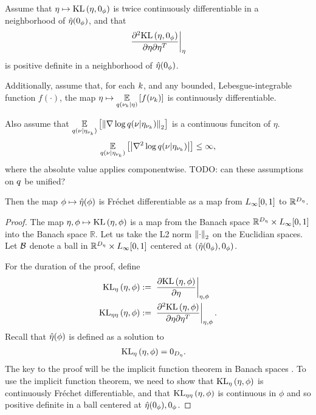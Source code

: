 \begin{thm}
%
Assume that $\eta \mapsto \mathrm{KL}\left(\eta, 0_\phi\right)$ is twice continuously
differentiable in a neighborhood of $\hat\eta(0_\phi)$, and that
%
\begin{align*}
%
\fracat{\partial^2 \KL{\eta, \phiz}}
                {\partial \eta \partial \eta^T}
                {\eta}%
\end{align*}
%
is positive definite in a neighborhood of $\hat\eta(0_\phi)$.

Additionally, assume that, for each $k$, and any bounded, Lebesgue-integrable
function $f(\cdot)$, the map $\eta \mapsto \underset{q(\nu_{k} \vert \eta)}{\mathbb{E}}\left[f(\nu_{k})\right]$
is continuously differentiable.

Also assume that $\underset{q(\nu \vert \eta_{\nu_{k}})}{\mathbb{E}}\left[\left\Vert\nabla \log q(\nu \vert \eta_{\nu_{k}})\right\Vert_2\right]$
is a continuous funciton of $\eta$.
%
\begin{align*}
%
\expect{\q(\nu \vert \etanuk)}{\abs{\nabla^2 \log \q(\nu \vert \etanuk)}} \le{} \infty,
%
\end{align*}
%
where the absolute value applies componentwise.  TODO: can these assumptions
on $q$ be unified?

Then the map $\phi \mapsto \hat\eta(\phi)$ is Fr{\'e}chet differentiable
as a map from ${L_{\infty}[0,1]}$ to $\mathbb{R}^{D_{\eta}}$.
%
\begin{proof}
%
The map $\eta, \phi \mapsto \mathrm{KL}\left(\eta, \phi\right)$ is a map from the Banach space
$\mathbb{R}^{D_{\eta}} \times {L_{\infty}[0,1]}$ into the Banach space $\mathbb{R}$. Let us
take the L2 norm $\left\Vert\cdot\right\Vert_2$ on the Euclidian spaces.  Let $\mathcal{B}$ denote a
ball in $\mathbb{R}^{D_{\eta}} \times {L_{\infty}[0,1]}$ centered at $(\hat\eta(0_\phi), 0_\phi)$.

For the duration of the proof, define
%
\begin{align*}
%
\KLgrad{\eta, \phi} :={}&
    \fracat{\partial \KL{\eta, \phi}}{\partial \eta}{\eta, \phi}\\
\KLhess{\eta, \phi} :={}&
    \fracat{\partial^2 \KL{\eta, \phi}}
           {\partial \eta \partial \eta^T}{\eta, \phi}.
%
\end{align*}
%
Recall that $\hat\eta(\phi)$ is defined as a solution to
%
\begin{align*}
%
\KLgrad{\eta, \phi} ={}& 0_\etadim.
%
\end{align*}
%
The key to the proof will be the implicit function theorem in Banach spaces
\citet[Theorem 4.B(d)]{zeidler:2013:functional}. To use the implicit function
theorem, we need to show that $\mathrm{KL}_{\eta}\left(\eta, \phi\right)$ is continuously Fr{\'e}chet
differentiable, and that $\mathrm{KL}_{\eta\eta}\left(\eta, \phi\right)$ is continuous in $\phi$ and so
positive definite in a ball centered at $\hat\eta(0_\phi), 0_\phi$.


\end{proof}
\end{thm}
